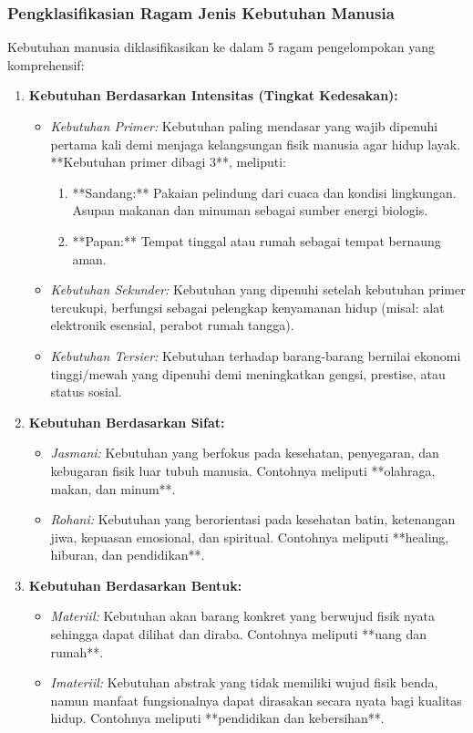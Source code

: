 \documentclass[12pt, a4paper]{article}
\begin{document}
\subsubsection{Pengklasifikasian Ragam Jenis Kebutuhan Manusia}
Kebutuhan manusia diklasifikasikan ke dalam 5 ragam pengelompokan yang komprehensif:
\begin{enumerate}
    \item \textbf{Kebutuhan Berdasarkan Intensitas (Tingkat Kedesakan):}
    \begin{itemize}
        \item \textit{Kebutuhan Primer:} Kebutuhan paling mendasar yang wajib dipenuhi pertama kali demi menjaga kelangsungan fisik manusia agar hidup layak. **Kebutuhan primer dibagi 3**, meliputi:
        \begin{enumerate}
            \item **Sandang:** Pakaian pelindung dari cuaca dan kondisi lingkungan.
             Asupan makanan dan minuman sebagai sumber energi biologis.
            \item **Papan:** Tempat tinggal atau rumah sebagai tempat bernaung aman.
        \end{enumerate}
        \item \textit{Kebutuhan Sekunder:} Kebutuhan yang dipenuhi setelah kebutuhan primer tercukupi, berfungsi sebagai pelengkap kenyamanan hidup (misal: alat elektronik esensial, perabot rumah tangga).
        \item \textit{Kebutuhan Tersier:} Kebutuhan terhadap barang-barang bernilai ekonomi tinggi/mewah yang dipenuhi demi meningkatkan gengsi, prestise, atau status sosial.
    \end{itemize}

    \item \textbf{Kebutuhan Berdasarkan Sifat:}
    \begin{itemize}
        \item \textit{Jasmani:} Kebutuhan yang berfokus pada kesehatan, penyegaran, dan kebugaran fisik luar tubuh manusia. Contohnya meliputi **olahraga, makan, dan minum**.
        \item \textit{Rohani:} Kebutuhan yang berorientasi pada kesehatan batin, ketenangan jiwa, kepuasan emosional, dan spiritual. Contohnya meliputi **healing, hiburan, dan pendidikan**.
    \end{itemize}

    \item \textbf{Kebutuhan Berdasarkan Bentuk:}
    \begin{itemize}
        \item \textit{Materiil:} Kebutuhan akan barang konkret yang berwujud fisik nyata sehingga dapat dilihat dan diraba. Contohnya meliputi **uang dan rumah**.
        \item \textit{Imateriil:} Kebutuhan abstrak yang tidak memiliki wujud fisik benda, namun manfaat fungsionalnya dapat dirasakan secara nyata bagi kualitas hidup. Contohnya meliputi **pendidikan dan kebersihan**.
    \end{itemize}


\end{enumerate}
\end{document}
